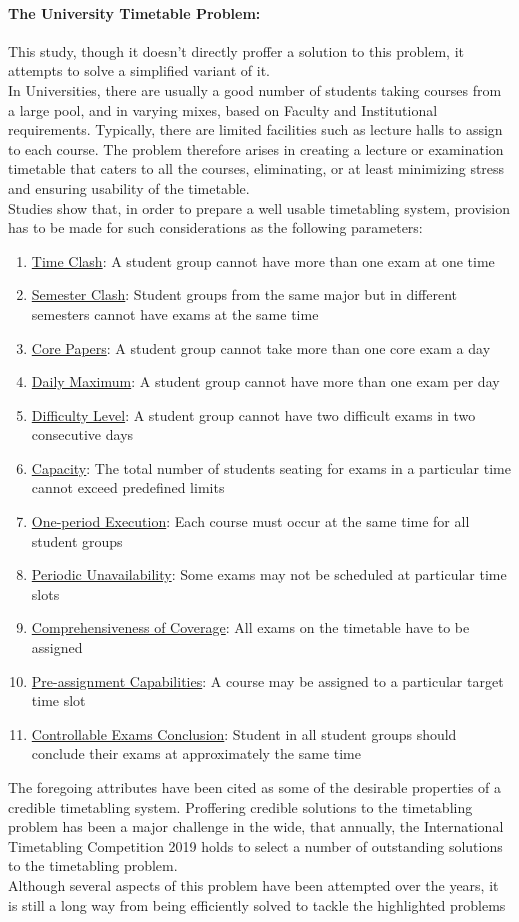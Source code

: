 \documentclass[a4paper,openany]{book}
\begin{document}
			\paragraph{The University Timetable Problem:}
			This study, though it doesn't directly proffer a solution to this problem, it attempts to solve a simplified variant of it.
			\\In Universities, there are usually a good number of students taking courses from a large pool, and in varying mixes, based on Faculty and Institutional requirements. Typically, there are limited facilities such as lecture halls to assign to each course. The problem therefore arises in creating a lecture or examination timetable that caters to all the courses, eliminating, or at least minimizing stress and ensuring usability of the timetable.
			\\Studies show that, in order to prepare a well usable timetabling system, provision has to be made for such considerations as the following parameters:
			\begin{enumerate}
				\item \underline{Time Clash}: A student group cannot have more than one exam at one time
				\item \underline{Semester Clash}: Student groups from the same major but in different semesters cannot have exams at the same time
				\item \underline{Core Papers}: A student group cannot take more than one core exam a day
				\item \underline{Daily Maximum}: A student group cannot have more than one exam per day
				\item \underline{Difficulty Level}: A student group cannot have two difficult exams in two consecutive days
				\item \underline{Capacity}: The total number of students seating for exams in a particular time cannot exceed predefined limits
				\item \underline{One-period Execution}: Each course must occur at the same time for all student groups
				\item \underline{Periodic Unavailability}: Some exams may not be scheduled at particular time slots
				\item \underline{Comprehensiveness of Coverage}: All exams on the timetable have to be assigned
				\item \underline{Pre-assignment Capabilities}: A course may be assigned to a particular target time slot
				\item \underline{Controllable Exams Conclusion}: Student in all student groups should conclude their exams at approximately the same time
			\end{enumerate}
			The foregoing attributes have been cited as some of the desirable properties of a credible timetabling system. Proffering credible solutions to the timetabling problem has been a major challenge in the wide, that annually, the International Timetabling Competition 2019 \cite{itc2019} holds to select a number of outstanding solutions to the timetabling problem.\\
			Although several aspects of this problem have been attempted over the years, it is still a long way from being efficiently solved to tackle the highlighted problems
\end{document}
